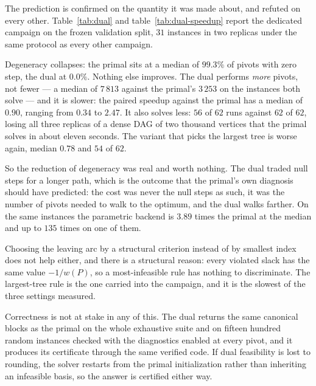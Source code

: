 The prediction is confirmed on the quantity it was made about, and refuted on
every other. Table~\ref{tab:dual} and table~\ref{tab:dual-speedup} report the
dedicated campaign on the frozen validation split, $31$ instances in two
replicas under the same protocol as every other campaign.

Degeneracy collapses: the primal sits at a median of $99.3\%$ of pivots with
zero step, the dual at $0.0\%$. Nothing else improves. The dual performs
\emph{more} pivots, not fewer --- a median of $7\,813$ against the primal's
$3\,253$ on the instances both solve --- and it is slower: the paired speedup
against the primal has a median of $0.90$, ranging from $0.34$ to $2.47$. It
also solves less: $56$ of $62$ runs against $62$ of $62$, losing all three
replicas of a dense DAG of two thousand vertices that the primal solves in
about eleven seconds. The variant that picks the largest tree is worse again,
median $0.78$ and $54$ of $62$.

So the reduction of degeneracy was real and worth nothing. The dual traded null
steps for a longer path, which is the outcome that the primal's own diagnosis
should have predicted: the cost was never the null steps as such, it was the
number of pivots needed to walk to the optimum, and the dual walks farther. On
the same instances the parametric backend is $3.89$ times the primal at the
median and up to $135$ times on one of them.

Choosing the leaving arc by a structural criterion instead of by smallest index
does not help either, and there is a structural reason: every violated slack has
the same value $-1/w(P)$, so a most-infeasible rule has nothing to discriminate.
The largest-tree rule is the one carried into the campaign, and it is the slowest
of the three settings measured.

Correctness is not at stake in any of this. The dual returns the same canonical
blocks as the primal on the whole exhaustive suite and on fifteen hundred
random instances checked with the diagnostics enabled at every pivot, and it
produces its certificate through the same verified code. If dual feasibility is
lost to rounding, the solver restarts from the primal initialization rather than
inheriting an infeasible basis, so the answer is certified either way.

